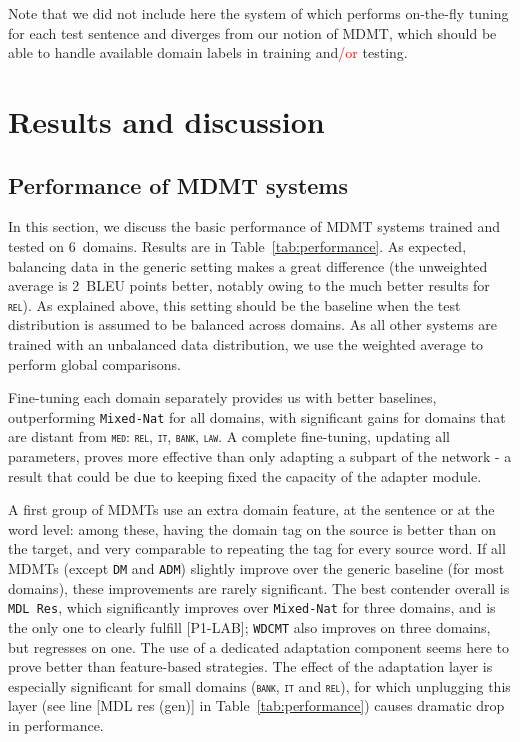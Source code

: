 \documentclass[11pt,a4paper]{article}
\newcommand{\fyDone}[1]{\done[FY]\Todo[FY:]{\textcolor{orange}{#1}}}
\newcommand{\revision}[1]{\textcolor{red}{#1}}
\newcommand{\domain}[1]{\texttt{\textsc{#1}}}
\newcommand{\system}[1]{\texttt{{#1}}}
\begin{document}
Note that we did not include here the system of \cite{Farajian17multidomain} which performs on-the-fly tuning for each test sentence and diverges from our notion of MDMT, which should be able to handle available domain labels in training and\revision{/or} testing.

\section{Results and discussion \label{sec:results}}

\subsection{Performance of MDMT systems \label{ssec:rawperformance}}
In this section, we discuss the basic performance of MDMT systems trained and tested on $6$~domains. Results are in Table~\ref{tab:performance}. As expected, balancing data in the generic setting makes a great difference (the unweighted average is 2~BLEU points\fyDone{BP?} better, notably owing to the much better results for \domain{rel}). As explained above, this setting should be the baseline when the test distribution is assumed to be balanced across domains. As all other systems are trained with an unbalanced data distribution, we use the weighted average to perform global comparisons.

Fine-tuning each domain separately provides us with better baselines, outperforming \system{Mixed-Nat} for all domains, with significant gains for domains that are distant from \domain{med}: \domain{rel}, \domain{it}, \domain{bank}, \domain{law}. A complete fine-tuning, updating all parameters, proves more effective than only adapting a subpart of the network - a result that could be due to keeping fixed the capacity of the adapter module.\fyDone{Add 2 averages ?}\fyDone{Significance testing wrt Mix Generic, Full Fine-tuned, for each domain}

A  first group of MDMTs use an extra domain feature, at the sentence or at the word level: among these, having the domain tag on the source is better than on the target, and very comparable to repeating the tag for every source word. If all MDMTs (except \system{DM} and \system{ADM}) slightly improve over the generic baseline (for most domains), these improvements are rarely significant. The best contender overall is \system{MDL Res}, which significantly improves over \system{Mixed-Nat} for three domains, and is the only one to clearly fulfill [P1-LAB]; \system{WDCMT} also improves on three domains, but regresses on one. The use of a dedicated adaptation component seems here to prove better than feature-based strategies. The effect of the adaptation layer is especially significant for small domains (\domain{bank}, \domain{it} and \domain{rel}), for which unplugging this layer (see line [MDL res (gen)] in Table~\ref{tab:performance}) causes dramatic drop in performance.\fyDone{why LDC does not outperform DC as in Minh's paper (for en2fr MED) ?}
\end{document}
